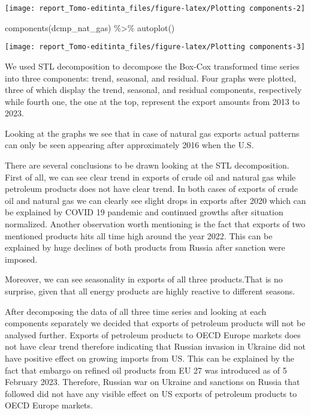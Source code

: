 \documentclass[
]{article}
\newenvironment{Shaded}{\begin{snugshade}}{\end{snugshade}}
\newcommand{\FunctionTok}[1]{\textcolor[rgb]{0.00,0.00,0.00}{#1}}
\newcommand{\NormalTok}[1]{#1}
\newcommand{\SpecialCharTok}[1]{\textcolor[rgb]{0.00,0.00,0.00}{#1}}
\begin{document}
\begin{center}\texttt{[image: report\_Tomo-editinta\_files/figure-latex/Plotting components-2]} \end{center}

\begin{Shaded}
\begin{Highlighting}[]
\FunctionTok{components}\NormalTok{(dcmp\_nat\_gas) }\SpecialCharTok{\%\textgreater{}\%} \FunctionTok{autoplot}\NormalTok{()}
\end{Highlighting}
\end{Shaded}

\begin{center}\texttt{[image: report\_Tomo-editinta\_files/figure-latex/Plotting components-3]} \end{center}

We used STL decomposition to decompose the Box-Cox transformed time
series into three components: trend, seasonal, and residual. Four graphs
were plotted, three of which display the trend, seasonal, and residual
components, respectively while fourth one, the one at the top, represent
the export amounts from 2013 to 2023.

Looking at the graphs we see that in case of natural gas exports actual
patterns can only be seen appearing after approximately 2016 when the
U.S.

There are several conclusions to be drawn looking at the STL
decomposition. First of all, we can see clear trend in exports of crude
oil and natural gas while petroleum products does not have clear trend.
In both cases of exports of crude oil and natural gas we can clearly see
slight drops in exports after 2020 which can be explained by COVID 19
pandemic and continued growths after situation normalized. Another
observation worth mentioning is the fact that exports of two mentioned
products hits all time high around the year 2022. This can be explained
by huge declines of both products from Russia after sanction were
imposed.

Moreover, we can see seasonality in exports of all three products.That
is no surprise, given that all energy products are highly reactive to
different seasons.

After decomposing the data of all three time series and looking at each
components separately we decided that exports of petroleum products will
not be analysed further. Exports of petroleum products to OECD Europe
markets does not have clear trend therefore indicating that Russian
invasion in Ukraine did not have positive effect on growing imports from
US. This can be explained by the fact that embargo on refined oil
products from EU 27 was introduced as of 5 February 2023. Therefore,
Russian war on Ukraine and sanctions on Russia that followed did not
have any visible effect on US exports of petroleum products to OECD
Europe markets.
\end{document}
